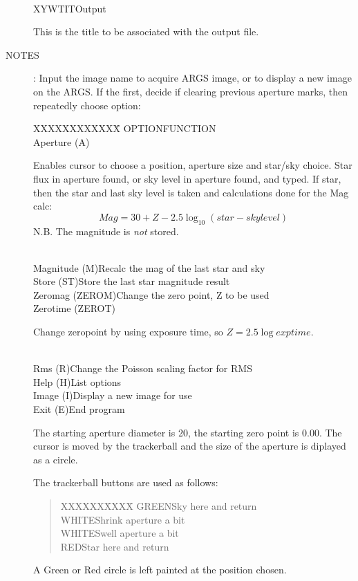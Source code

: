 \begin{description}
\begin{tabbing}
\begin{minipage}[t]{100mm}
\end{minipage}\\
XYWTIT\>Output\>\begin{minipage}[t]{100mm}
This is the title to be associated with the output file.
\end{minipage}
\end{tabbing}
\item [NOTES]:
Input the image name to acquire ARGS image, or to display a new image on the
ARGS.
If the first, decide if clearing previous aperture marks, then repeatedly
choose option:
\begin{tabbing}
XXXXXXXXXXXX\=\kill
OPTION\>FUNCTION\\
Aperture (A)\>\begin{minipage}[t]{114mm}
Enables cursor to choose a position, aperture size and star/sky choice.
Star flux in aperture found, or sky level in aperture found, and typed.
If star, then the star and last sky level is taken and calculations done for
the Mag calc:
\[Mag = 30 + Z - 2.5 \log_{10} (star-sky level)\]
N.B. The magnitude is {\em not} stored.
\end{minipage}\\
Magnitude (M)\>Recalc the mag of the last star and sky\\
Store (ST)\>Store the last star magnitude result\\
Zeromag (ZEROM)\>Change the zero point, Z to be used\\
Zerotime (ZEROT)\>\begin{minipage}[t]{120mm}
Change zeropoint by using exposure time, so $Z = 2.5 \log exptime$.
\end{minipage}\\
Rms  (R)\>Change the Poisson scaling factor for RMS\\
Help (H)\>List options\\
Image (I)\>Display a new image for use\\
Exit (E)\>End program
\end{tabbing}
The starting aperture diameter is 20, the starting zero point is 0.00.
The cursor is moved by the trackerball and the size of the aperture is diplayed
as a circle.

The trackerball buttons are used as follows:
\begin{quote}
\begin{tabbing}
XXXXXX\=XXXX\=\kill
GREEN\>Sky here and return\\
WHITE\>Shrink aperture a bit\\
WHITE\>Swell aperture a bit\\
RED\>Star here and return
\end{tabbing}
\end{quote}
A Green or Red circle is left painted at the position chosen.


\end{description}
